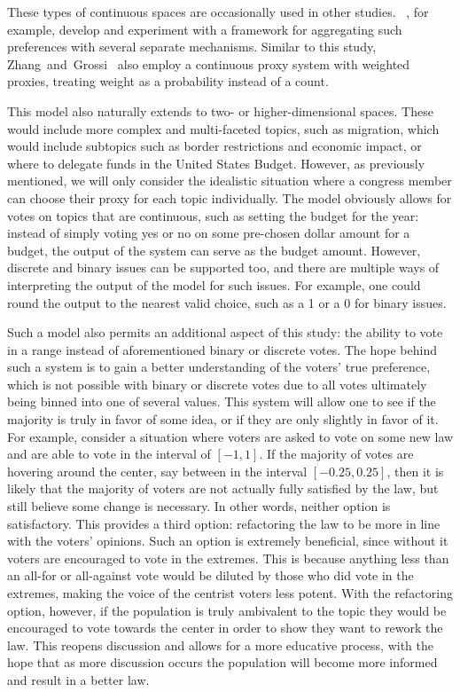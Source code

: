 These types of continuous spaces are occasionally used in other studies.
~\cite{Bulteau2021}, for example, develop and experiment with a framework
for aggregating such preferences with several separate mechanisms.
Similar to this study, Zhang~and~Grossi~\cite{Zhang2022} also employ a continuous
proxy system with weighted proxies, treating weight as a probability instead of a count.

This model also naturally extends to two- or higher-dimensional spaces.
These would include more complex and multi-faceted topics, such as migration, which
would include subtopics such as border restrictions and economic impact, or where to
delegate funds in the United States Budget.
However, as previously mentioned, we will only consider the idealistic situation
where a congress member can choose their proxy for each topic individually.
The model obviously allows for votes on topics that are continuous, such as setting the
budget for the year: instead of simply voting yes or no on some pre-chosen dollar
amount for a budget, the output of the system can serve as the budget amount.
However, discrete and binary issues can be supported too, and there are multiple
ways of interpreting the output of the model for such issues.
For example, one could round the output to the nearest valid choice, such as a 1 or a
0 for binary issues.

Such a model also permits an additional aspect of this study: the ability to vote in
a range instead of aforementioned binary or discrete votes.
The hope behind such a system is to gain a better understanding of the voters'
true preference, which is not possible with binary or discrete votes due to all votes
ultimately being binned into one of several values.
This system will allow one to see if the majority is truly in favor of some idea, or
if they are only slightly in favor of it.
For example, consider a situation where voters are asked to vote on some new law and
are able to vote in the interval of $[-1, 1]$.
If the majority of votes are hovering around the center, say between in the interval
$[-0.25, 0.25]$, then it is likely that the majority of voters are not actually fully
satisfied by the law, but still believe some change is necessary.
In other words, neither option is satisfactory.
This provides a third option: refactoring the law to be more in line with the
voters' opinions.
Such an option is extremely beneficial, since without it voters are encouraged to
vote in the extremes.
This is because anything less than an all-for or all-against vote would be diluted by
those who did vote in the extremes, making the voice of the centrist voters less potent.
With the refactoring option, however, if the population is truly ambivalent to the
topic they would be encouraged to vote towards the center in order to show they want
to rework the law.
This reopens discussion and allows for a more educative process, with the hope that
as more discussion occurs the population will become more informed and result in a
better law.

